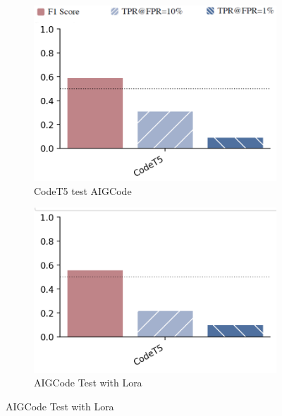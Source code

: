 \begin{figure}[H]
    \begin{subfigure}[b]{0.45\textwidth}
        \centering
        \includegraphics[width=\linewidth]{img/TEST/CodeT5/CodemirageAIG/c4956c36c6626a77f6652d1ebf105dbfddb991daccefd5e07418da50.png}
        \caption{CodeT5 test AIGCode}
        \label{fig:NOLora}
    \end{subfigure}
    \hfill
    \begin{subfigure}[b]{0.45\textwidth}
        \centering
        \includegraphics[width=\linewidth]{img/eb8b31047f0e2de82bd042598326e89a9a5df1159f63c81e41cff8ed.png}
        \caption{AIGCode Test with Lora}
        \label{fig:Lora}
    \end{subfigure}
\end{figure}